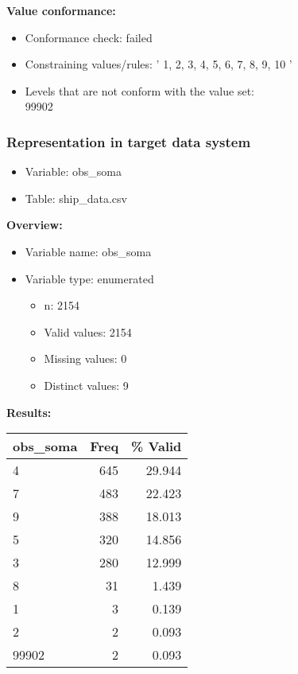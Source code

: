 \documentclass[
]{article}
\providecommand{\tightlist}{%
  \setlength{\itemsep}{0pt}\setlength{\parskip}{0pt}}
\begin{document}
\textbf{Value conformance:}

\begin{itemize}
\tightlist
\item
  Conformance check: failed
\item
  Constraining values/rules: ' 1, 2, 3, 4, 5, 6, 7, 8, 9, 10 '
\item
  Levels that are not conform with the value set:\\
  99902
\end{itemize}

\newpage

\hypertarget{representation-in-target-data-system-20}{%
\subsubsection{\texorpdfstring{Representation in \textbf{target} data
system}{Representation in target data system}}\label{representation-in-target-data-system-20}}

\begin{itemize}
\tightlist
\item
  Variable: obs\_soma
\item
  Table: ship\_data.csv
\end{itemize}

\textbf{Overview:}

\begin{itemize}
\tightlist
\item
  Variable name: obs\_soma
\item
  Variable type: enumerated

  \begin{itemize}
  \tightlist
  \item
    n: 2154
  \item
    Valid values: 2154
  \item
    Missing values: 0
  \item
    Distinct values: 9
  \end{itemize}
\end{itemize}

\textbf{Results:}\\

\begin{table}[H]
\centering
\begin{tabular}{l|r|r}
\hline
\textbf{obs\_soma} & \textbf{Freq} & \textbf{\% Valid}\\
\hline
4 & 645 & 29.944\\
\hline
7 & 483 & 22.423\\
\hline
9 & 388 & 18.013\\
\hline
5 & 320 & 14.856\\
\hline
3 & 280 & 12.999\\
\hline
8 & 31 & 1.439\\
\hline
1 & 3 & 0.139\\
\hline
2 & 2 & 0.093\\
\hline
99902 & 2 & 0.093\\
\hline
\end{tabular}
\end{table}
\end{document}

